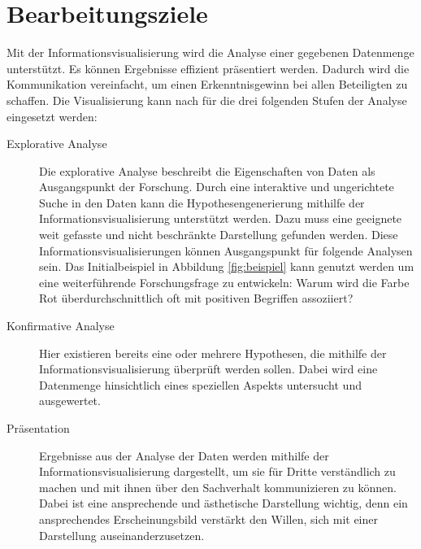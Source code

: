 \documentclass[a4paper, 
               12pt,
               DIV=calc,
               version=first,
               pdftex,
               headsepline,
               footsepline,
               bibtotocnumbered,
               liststotocnumbered]{scrreprt}
\begin{document}
\section{Bearbeitungsziele}
\label{sec:Ziele}
Mit der Informationsvisualisierung wird die Analyse einer gegebenen Datenmenge unterstützt.
Es können Ergebnisse effizient präsentiert werden. Dadurch wird die Kommunikation vereinfacht,
um einen Erkenntnisgewinn bei allen Beteiligten zu schaffen.
Die Visualisierung kann nach \cite{Schumann} für die drei folgenden Stufen der Analyse eingesetzt werden:
\begin{description}
\item[Explorative Analyse]
Die explorative Analyse beschreibt die Eigenschaften von Daten als Ausgangspunkt der Forschung.
Durch eine interaktive und ungerichtete Suche in den Daten
kann die Hypothesengenerierung mithilfe der Informationsvisualisierung unterstützt werden. Dazu muss eine
geeignete weit gefasste und nicht beschränkte Darstellung gefunden werden. Diese Informationsvisualisierungen
können Ausgangspunkt für folgende Analysen sein. Das Initialbeispiel in Abbildung \ref{fig:beispiel} kann
genutzt werden um eine weiterführende Forschungsfrage zu entwickeln: Warum wird die Farbe Rot überdurchschnittlich
oft mit positiven Begriffen assoziiert?
\item[Konfirmative Analyse]
Hier existieren bereits eine oder mehrere Hypothesen, die mithilfe der Informationsvisualisierung überprüft werden sollen.
Dabei wird eine Datenmenge hinsichtlich eines speziellen Aspekts untersucht und ausgewertet.
\item[Präsentation]
Ergebnisse aus der Analyse der Daten werden mithilfe der Informationsvisualisierung dargestellt, um sie für Dritte verständlich
zu machen und mit ihnen über den Sachverhalt kommunizieren zu können.
Dabei ist eine ansprechende und ästhetische Darstellung wichtig, denn
ein ansprechendes Erscheinungsbild verstärkt den Willen, sich mit einer Darstellung auseinanderzusetzen.
\end{description}
\end{document}
